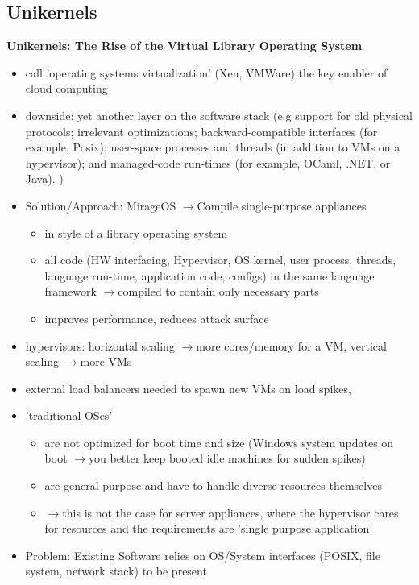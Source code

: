 \documentclass{scrartcl}
\newcommand{\means}{$\rightarrow{}$}
\begin{document}
\subsection{Unikernels}
\textbf{Unikernels: The Rise of the Virtual Library Operating System}
\begin{itemize}
    \item call 'operating systems virtualization' (Xen, VMWare) the key enabler of cloud computing
    \item downside: yet another layer on the software stack (e.g support for old physical protocols; irrelevant optimizations; backward-compatible interfaces (for example, Posix); user-space processes and threads (in addition to VMs on a hypervisor); and managed-code run-times (for example, OCaml, .NET, or Java). )
    \item Solution/Approach: MirageOS \means Compile single-purpose appliances 
    \begin{itemize}
        \item in style of a library operating system
        \item all code (HW interfacing, Hypervisor, OS kernel, user process, threads, language run-time, application code, configs) in the same language framework \means compiled to contain only necessary parts
        \item improves performance, reduces attack surface
    \end{itemize}
    \item hypervisors: horizontal scaling \means more cores/memory for a VM, vertical scaling \means more VMs
    \item external load balancers needed to spawn new VMs on load spikes, 
    \item 'traditional  OSes' 
    \begin{itemize}
        \item are not optimized for boot time and size (Windows system updates on boot \means you better keep booted idle machines for sudden spikes)
        \item are general purpose and have to handle diverse resources themselves 
        \item[]\means this is not the case for server appliances, where the hypervisor cares for resources and the requirements are 'single purpose application'
    \end{itemize}
    \item Problem: Existing Software relies on OS/System interfaces (POSIX, file system, network stack) to be present 

\end{itemize}
\end{document}
